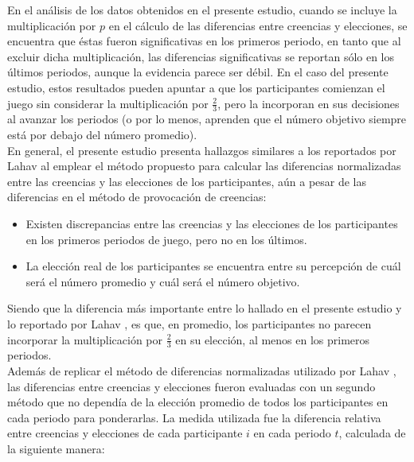 En el análisis de los datos obtenidos en el presente estudio, cuando se incluye la multiplicación por $p$ en el cálculo de las diferencias entre creencias y elecciones, se encuentra que éstas fueron significativas en los primeros periodo, en tanto que  al excluir dicha multiplicación, las diferencias significativas se reportan sólo en los últimos periodos, aunque la evidencia parece ser débil. En el caso del presente estudio, estos resultados pueden apuntar a que los participantes comienzan el juego sin considerar la multiplicación por $\frac{2}{3}$, pero la incorporan en sus decisiones al avanzar los periodos (o por lo menos, aprenden que el número objetivo siempre está por debajo del número promedio).\\

En general, el presente estudio presenta hallazgos similares a los reportados por Lahav \parencite*{Lahav2015} al emplear el método propuesto para calcular las diferencias normalizadas entre las creencias y las elecciones de los participantes, aún a pesar de las diferencias en el método de provocación de creencias:\\

\begin{itemize}
\item Existen discrepancias entre las creencias y las elecciones de los participantes en los primeros periodos de juego, pero no en los últimos.\\

\item La elección real de los participantes se encuentra entre su percepción de cuál será el número promedio y cuál será el número objetivo.\\
\end{itemize}

Siendo que la diferencia más importante entre lo hallado en el presente estudio y lo reportado por Lahav \parencite*{Lahav2015},  es que, en promedio, los participantes no parecen incorporar la multiplicación por $\frac{2}{3}$ en su elección, al menos en los primeros periodos.\\

Además de replicar el método de diferencias normalizadas utilizado por Lahav \parencite*{Lahav2015}, las diferencias entre creencias y elecciones fueron evaluadas con un segundo método que no dependía de la elección promedio de todos los participantes en cada periodo para ponderarlas. La medida utilizada fue la diferencia relativa entre creencias y elecciones de cada participante $i$ en cada periodo $t$, calculada de la siguiente manera:\\

